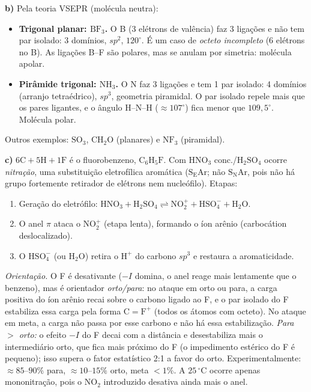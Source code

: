 \documentclass{article}%
\begin{document}
\medskip
\textbf{b)} Pela teoria VSEPR (molécula neutra):
\begin{itemize}
\item \textbf{Trigonal planar: $\mathrm{BF_3}$.} O B (3 elétrons de valência) faz 3 ligações e não tem par isolado: 3 domínios, $sp^2$, $120^\circ$. É um caso de \emph{octeto incompleto} (6 elétrons no B). As ligações B--F são polares, mas se anulam por simetria: molécula apolar.
\item \textbf{Pirâmide trigonal: $\mathrm{NH_3}$.} O N faz 3 ligações e tem 1 par isolado: 4 domínios (arranjo tetraédrico), $sp^3$, geometria piramidal. O par isolado repele mais que os pares ligantes, e o ângulo H--N--H ($\approx107^\circ$) fica menor que $109{,}5^\circ$. Molécula polar.
\end{itemize}
Outros exemplos: $\mathrm{SO_3}$, $\mathrm{CH_2O}$ (planares) e $\mathrm{NF_3}$ (piramidal).

\medskip
\textbf{c)} $6\mathrm{C}+5\mathrm{H}+1\mathrm{F}$ é o fluorobenzeno, $\mathrm{C_6H_5F}$. Com $\mathrm{HNO_3}$ conc./$\mathrm{H_2SO_4}$ ocorre \emph{nitração}, uma substituição eletrofílica aromática ($\mathrm{S_EAr}$; não $\mathrm{S_NAr}$, pois não há grupo fortemente retirador de elétrons nem nucleófilo). Etapas:
\begin{enumerate}
\item Geração do eletrófilo: $\mathrm{HNO_3 + H_2SO_4 \rightleftharpoons NO_2^+ + HSO_4^- + H_2O}$.
\item O anel $\pi$ ataca o $\mathrm{NO_2^+}$ (etapa lenta), formando o íon arênio (carbocátion deslocalizado).
\item O $\mathrm{HSO_4^-}$ (ou $\mathrm{H_2O}$) retira o $\mathrm{H^+}$ do carbono $sp^3$ e restaura a aromaticidade.
\end{enumerate}
\emph{Orientação.} O F é desativante ($-I$ domina, o anel reage mais lentamente que o benzeno), mas é orientador \emph{orto/para}: no ataque em orto ou para, a carga positiva do íon arênio recai sobre o carbono ligado ao F, e o par isolado do F estabiliza essa carga pela forma $\mathrm{C{=}F^+}$ (todos os átomos com octeto). No ataque em meta, a carga não passa por esse carbono e não há essa estabilização. \emph{Para $>$ orto:} o efeito $-I$ do F decai com a distância e desestabiliza mais o intermediário orto, que fica mais próximo do F (o impedimento estérico do F é pequeno); isso supera o fator estatístico 2:1 a favor do orto. Experimentalmente: $\approx85$--$90\%$ para, $\approx10$--$15\%$ orto, meta $<1\%$. A $25\,^\circ\mathrm{C}$ ocorre apenas mononitração, pois o $\mathrm{NO_2}$ introduzido desativa ainda mais o anel.
\end{document}
